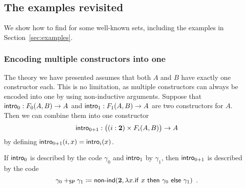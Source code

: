 \documentclass{article}
\begin{document}
\begin{example}





\end{example}

\subsection{The examples revisited}
\label{sec:examples-revisited}

We show how to find \gammaAB{} for some well-known sets, including the
examples in Section~\ref{sec:examples}.

\subsubsection{Encoding multiple constructors into one}
\label{sec:comb-constructors}

The theory we have presented assumes that both $A$ and $B$ have
exactly one constructor each. This is no limitation, as multiple
constructors can always be encoded into one by using non-inductive
arguments. Suppose that $\mathsf{intro}_{0} : F_0(A, B) \to A$ and $\mathsf{intro}_{1} :
F_1(A, B) \to A$ are two constructors for $A$. Then we can combine
them into one constructor
\[
\mathsf{intro}_{0 + 1} : \big((i : \mathbf{2}) \times F_i(A, B)\big) \to A
\]
by defining $\mathsf{intro}_{0 +1}(i, x) = \mathsf{intro}_{i}(x)$.

If $\mathsf{intro}_{0}$ is described by the code $\gamma_0$ and $\mathsf{intro}_{1}$ by
$\gamma_1$, then $\mathsf{intro}_{0 + 1}$ is described by the code
\[
\gamma_0 +_{\mathsf{SP}} \gamma_1 \coloneqq
\mathsf{non}\text{-}\mathsf{ind}(\mathbf{2}, \lambda x.\mathsf{if}~x~\mathsf{then}~\gamma_0~\mathsf{else}~\gamma_1) \enspace .
\]
\end{document}
